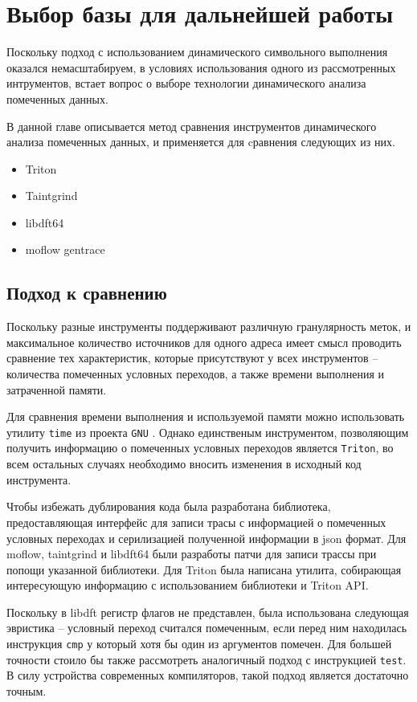 \chapter{Выбор базы для дальнейшей работы}

Поскольку подход с использованием динамического символьного выполнения оказался немасштабируем, в условиях использования одного из рассмотренных интрументов, встает вопрос о выборе технологии динамического анализа помеченных данных.

В данной главе описывается метод сравнения инструментов динамического анализа помеченных данных, и применяется для cравнения следующих из них.

\begin{itemize}
    \item Triton
    \item Taintgrind
    \item libdft64
    \item moflow gentrace
\end{itemize}

\section{Подход к сравнению}

Поскольку разные инструменты поддерживают различную гранулярность меток, и максимальное количество источников для одного адреса имеет смысл проводить сравнение тех характеристик, которые присутствуют у всех инструментов -- количества помеченных условных переходов, а также времени выполнения и затраченной памяти.

Для сравнения времени выполнения и используемой памяти можно использовать утилиту \texttt{time} из проекта \texttt{GNU} \cite{TIME}. Однако единственым инструментом, позволяющим получить информацию о помеченных условных переходов является \texttt{Triton}, во всем остальных случаях необходимо вносить изменения в исходный код инструмента. 

Чтобы избежать дублирования кода была разработана библиотека, предоставляющая интерфейс для записи трасы с информацией о помеченных условных переходах и серилизацией полученной информации в json формат. Для moflow, taintgrind и libdft64 были разработы патчи для записи трассы при попощи указанной библиотеки. Для Triton была написана утилита, собирающая интересующую информацию с использованием библиотеки и Triton API.

Поскольку в libdft регистр флагов не представлен, была использована следующая эвристика -- условный переход считался помеченным, если перед ним находилась инструкция \texttt{cmp} у который хотя бы один из аргументов помечен. Для большей точности стоило бы также рассмотреть аналогичный подход с инструкцией \texttt{test}. В силу устройства современных компиляторов, такой подход является достаточно точным.

